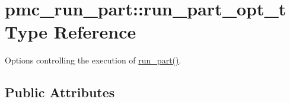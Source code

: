 \hypertarget{structpmc__run__part_1_1run__part__opt__t}{}\section{pmc\+\_\+run\+\_\+part\+:\+:run\+\_\+part\+\_\+opt\+\_\+t Type Reference}
\label{structpmc__run__part_1_1run__part__opt__t}


Options controlling the execution of \mbox{\hyperlink{namespacepmc__run__part_af2f5c765b1f86663d85b7ca882325eca}{run\+\_\+part()}}.  


\subsection*{Public Attributes}
